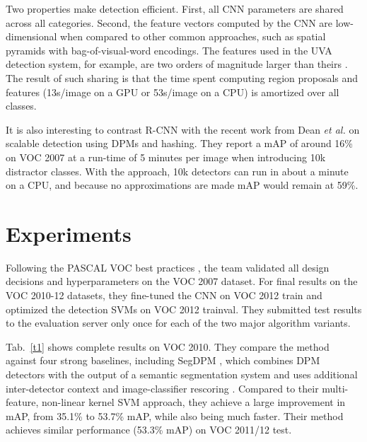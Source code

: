 \documentclass[10pt,twocolumn,letterpaper]{article}
\begin{document}
Two properties make detection efficient. First, all CNN parameters are shared across all categories. Second, the feature vectors computed by the CNN are low-dimensional when compared to other common approaches, such as spatial pyramids with bag-of-visual-word encodings. The features used in the UVA detection system, for example, are two orders of magnitude larger than theirs  \cite{Uijlings2013Selective}. The result of such sharing is that the time spent computing region proposals and features (13s/image on a GPU or 53s/image on a CPU) is amortized over all classes.

It is also interesting to contrast R-CNN with the recent work from Dean \emph{et al.} on scalable detection using DPMs and hashing. They report a mAP of around 16\% on VOC 2007 at a run-time of 5 minutes per image when introducing 10k distractor classes. With the approach, 10k detectors can run in about a minute on a CPU, and because no approximations are made mAP would remain at 59\%.

\section{Experiments}

Following the PASCAL VOC best practices \cite{Everingham2010The}, the team validated all design decisions and hyperparameters on the VOC 2007 dataset. For final results on the VOC 2010-12 datasets, they fine-tuned the CNN on VOC 2012 train and optimized the detection SVMs on VOC 2012 trainval. They submitted test results to the evaluation server only once for each of the two major algorithm variants.

Tab.~\ref{t1} shows complete results on VOC 2010. They compare the method against four strong baselines, including SegDPM \cite{Fidler2013Bottom}, which combines DPM detectors with the output of a semantic segmentation system and uses additional inter-detector context and image-classifier rescoring \cite{Carreira2012Semantic}. Compared to their multi-feature, non-linear kernel SVM approach, they achieve a large improvement in mAP, from 35.1\% to 53.7\% mAP, while also being much faster. Their method achieves similar performance (53.3\% mAP) on VOC 2011/12 test.


{\small


}
\end{document}
